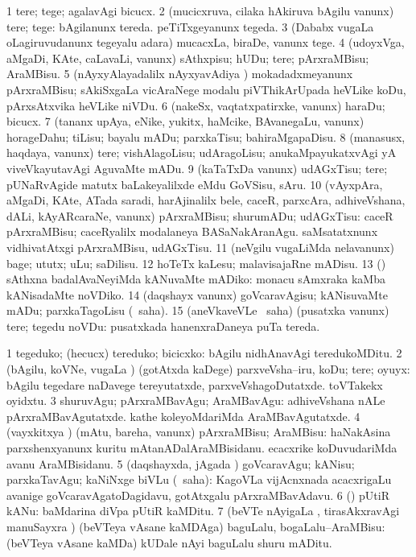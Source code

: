 \bentry
{}
\gl{\sakirx}
\bmng
\bnum
\num{1} tere; tege; agalavAgi bicucx. 
\num{2} (mucicxruva, cilaka hAkiruva bAgilu \mo vanunx) tere; tege:  bAgilanunx tereda.  peTiTxgeyanunx tegeda. 
\num{3} (Dababx \mo vugaLa oLagiruvudanunx tegeyalu adara) mucacxLa, biraDe, \mo vanunx tege. 
\num{4} (udoyxVga, aMgaDi, KAte, caLavaLi, \mo vanunx) sAthxpisu; hUDu; tere; pArxraMBisu; AraMBisu. 
\num{5} (nAyxyAlayadalilx nAyxyavAdiya \vi) mokadadxmeyanunx pArxraMBisu; sAkiSxgaLa vicAraNege modalu piVThikArUpada heVLike koDu, pArxsAtxvika heVLike niVDu. 
\num{6} (nakeSx, vaqtatxpatirxke, \mo vanunx) haraDu; bicucx. 
\num{7} (tananx upAya, eNike, yukitx, haMcike, BAvanegaLu, \mo vanunx) horageDahu; tiLisu; bayalu mADu; parxkaTisu; bahiraMgapaDisu. 
\num{8} (manasusx, haqdaya, \mo vanunx) tere; vishAlagoLisu; udAragoLisu; anukaMpayukatxvAgi yA viveVkayutavAgi AguvaMte mADu. 
\num{9} (kaTaTxDa \mo vanunx) udAGxTisu; tere; pUNaRvAgide matutx baLakeyalilxde eMdu GoVSisu, sAru. 
\num{10} (vAyxpAra, aMgaDi, KAte, ATada saradi, harAjinalilx bele, caceR, parxcAra, adhiveVshana, dALi, kAyARcaraNe, \mo vanunx) pArxraMBisu; shurumADu; udAGxTisu:  caceR pArxraMBisu; caceRyalilx modalaneya BASaNakAranAgu.  saMsatatxnunx vidhivatAtxgi pArxraMBisu, udAGxTisu. 
\num{11} (neVgilu \mo vugaLiMda nelavanunx) bage; ututx; uLu; saDilisu. 
\num{12} hoTeTx kaLesu; malavisajaRne mADisu. 
\num{13} (\nw) sAthxna badalAvaNeyiMda kANuvaMte mADiko:  monacu sAmxraka kaMba kANisadaMte noVDiko. 
\num{14} (daqshayx \mo vanunx) goVcaravAgisu; kANisuvaMte mADu; parxkaTagoLisu (\rUpa\ saha). 
\num{15} (aneVkaveVLe \akirx\ saha) (pusatxka \mo vanunx) tere; tegedu noVDu:  pusatxkada hanenxraDaneya puTa tereda. 
\enum
\emng

\noindent
\gl{\akirx}
\bmng
\bnum
\num{1} tegeduko; (hecucx) tereduko; bicicxko:  bAgilu nidhAnavAgi teredukoMDitu. 
\num{2} (bAgilu, koVNe, \mo vugaLa \vi) (gotAtxda kaDege) parxveVsha--iru, koDu; tere; oyuyx:  bAgilu tegedare naDavege tereyutatxde, parxveVshagoDutatxde.  toVTakekx oyidxtu. 
\num{3} shuruvAgu; pArxraMBavAgu; AraMBavAgu:  adhiveVshana nALe pArxraMBavAgutatxde.  kathe koleyoMdariMda AraMBavAgutatxde. 
\num{4} (vayxkitxya \vi) (mAtu, bareha, \mo vanunx) pArxraMBisu; AraMBisu:  haNakAsina parxshenxyanunx kuritu mAtanADalAraMBisidanu.  ecacxrike koDuvudariMda avanu AraMBisidanu. 
\num{5} (daqshayxda, jAgada \vi) goVcaravAgu; kANisu; parxkaTavAgu; kaNiNxge biVLu (\rUpa\ saha):  KagoVLa vijAcnxnada acacxrigaLu avanige goVcaravAgatoDagidavu, gotAtxgalu pArxraMBavAdavu. 
\num{6} (\nw) pUtiR kANu:  baMdarina diVpa pUtiR kaMDitu. 
\num{7} (beVTe nAyigaLa \vi, tirasAkxravAgi manuSayxra \vi) (beVTeya vAsane kaMDAga) baguLalu, bogaLalu--AraMBisu:  (beVTeya vAsane kaMDa) kUDale nAyi baguLalu shuru mADitu. 
\enum
\emng

